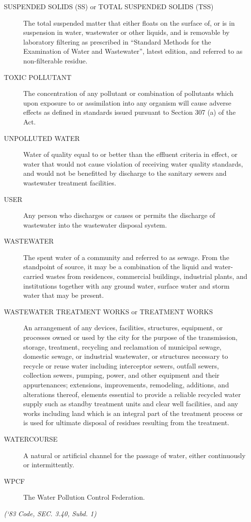 \begin{description}
\item[SUSPENDED SOLIDS (SS) or TOTAL SUSPENDED SOLIDS (TSS)] The total suspended matter that either floats on the surface of, or is in suspension in water, wastewater or other liquids, and is removable by laboratory filtering as prescribed in “Standard Methods for the Examination of Water and Wastewater”, latest edition, and referred to as non-filterable residue.
\item[TOXIC POLLUTANT] The concentration of any pollutant or combination of pollutants which upon exposure to or assimilation into any organism will cause adverse effects as defined in standards issued pursuant to Section 307 (a) of the Act.
\item[UNPOLLUTED WATER] Water of quality equal to or better than the effluent criteria in effect, or water that would not cause violation of receiving water quality standards, and would not be benefitted by discharge to the sanitary sewers and wastewater treatment facilities.
\item[USER] Any person who discharges or causes or permits the discharge of wastewater into the wastewater disposal system.
\item[WASTEWATER] The spent water of a community and referred to as sewage.  From the standpoint of source, it may be a combination of the liquid and water-carried wastes from residences, commercial buildings, industrial plants, and institutions together with any ground water, surface water and storm water that may be present.
\item[WASTEWATER TREATMENT WORKS or TREATMENT WORKS] An arrangement of any devices, facilities, structures, equipment, or processes owned or used by the city for the purpose of the transmission, storage, treatment, recycling and reclamation of municipal sewage, domestic sewage, or industrial wastewater, or structures necessary to recycle or reuse water including interceptor sewers, outfall sewers, collection sewers, pumping, power, and other equipment and their appurtenances; extensions, improvements, remodeling, additions, and alterations thereof, elements essential to provide a reliable recycled water supply such as standby treatment units and clear well facilities, and any works including land which is an integral part of the treatment process or is used for ultimate disposal of residues resulting from the treatment.
\item[WATERCOURSE] A natural or artificial channel for the passage of water, either continuously or intermittently.
\item[WPCF] The Water Pollution Control Federation.
\end{description}
\emph{(‘83 Code, SEC. 3.40, Subd. 1)}
